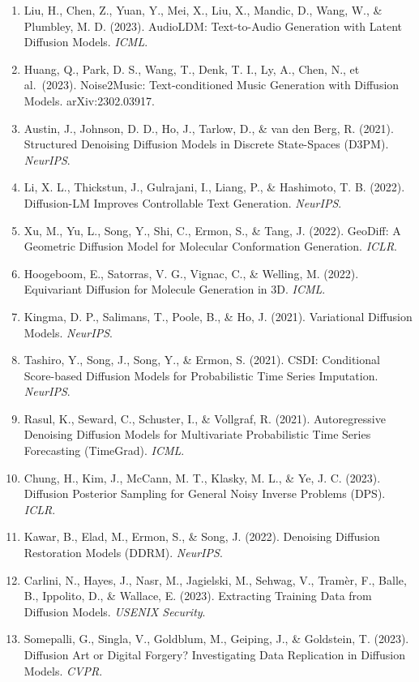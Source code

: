 \begin{enumerate}
\item
  Liu, H., Chen, Z., Yuan, Y., Mei, X., Liu, X., Mandic, D., Wang, W., \& Plumbley, M. D. (2023). AudioLDM: Text-to-Audio Generation with Latent Diffusion Models. \emph{ICML}.
\item
  Huang, Q., Park, D. S., Wang, T., Denk, T. I., Ly, A., Chen, N., et al.~(2023). Noise2Music: Text-conditioned Music Generation with Diffusion Models. arXiv:2302.03917.
\item
  Austin, J., Johnson, D. D., Ho, J., Tarlow, D., \& van den Berg, R. (2021). Structured Denoising Diffusion Models in Discrete State-Spaces (D3PM). \emph{NeurIPS}.
\item
  Li, X. L., Thickstun, J., Gulrajani, I., Liang, P., \& Hashimoto, T. B. (2022). Diffusion-LM Improves Controllable Text Generation. \emph{NeurIPS}.
\item
  Xu, M., Yu, L., Song, Y., Shi, C., Ermon, S., \& Tang, J. (2022). GeoDiff: A Geometric Diffusion Model for Molecular Conformation Generation. \emph{ICLR}.
\item
  Hoogeboom, E., Satorras, V. G., Vignac, C., \& Welling, M. (2022). Equivariant Diffusion for Molecule Generation in 3D. \emph{ICML}.
\item
  Kingma, D. P., Salimans, T., Poole, B., \& Ho, J. (2021). Variational Diffusion Models. \emph{NeurIPS}.
\item
  Tashiro, Y., Song, J., Song, Y., \& Ermon, S. (2021). CSDI: Conditional Score-based Diffusion Models for Probabilistic Time Series Imputation. \emph{NeurIPS}.
\item
  Rasul, K., Seward, C., Schuster, I., \& Vollgraf, R. (2021). Autoregressive Denoising Diffusion Models for Multivariate Probabilistic Time Series Forecasting (TimeGrad). \emph{ICML}.
\item
  Chung, H., Kim, J., McCann, M. T., Klasky, M. L., \& Ye, J. C. (2023). Diffusion Posterior Sampling for General Noisy Inverse Problems (DPS). \emph{ICLR}.
\item
  Kawar, B., Elad, M., Ermon, S., \& Song, J. (2022). Denoising Diffusion Restoration Models (DDRM). \emph{NeurIPS}.
\item
  Carlini, N., Hayes, J., Nasr, M., Jagielski, M., Sehwag, V., Tramèr, F., Balle, B., Ippolito, D., \& Wallace, E. (2023). Extracting Training Data from Diffusion Models. \emph{USENIX Security}.
\item
  Somepalli, G., Singla, V., Goldblum, M., Geiping, J., \& Goldstein, T. (2023). Diffusion Art or Digital Forgery? Investigating Data Replication in Diffusion Models. \emph{CVPR}.

\end{enumerate}
